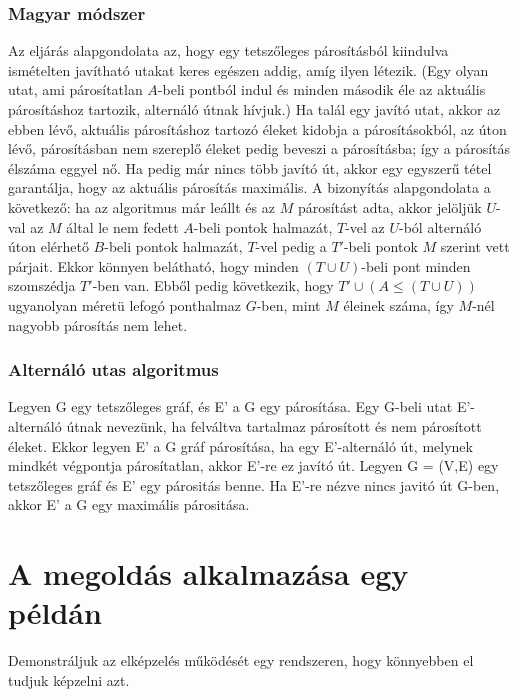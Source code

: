 \documentclass[12pt]{article}
\begin{document}
\subsubsection{Magyar módszer}

Az eljárás alapgondolata az, hogy egy tetszőleges párosításból kiindulva ismételten javítható utakat keres egészen addig, amíg ilyen létezik. (Egy olyan utat, ami párosítatlan $A$-beli pontból indul és minden második éle az aktuális párosításhoz tartozik, alternáló útnak hívjuk.) Ha talál egy javító utat, akkor az ebben lévő, aktuális párosításhoz tartozó éleket kidobja a párosításokból, az úton lévő, párosításban nem szereplő éleket pedig beveszi a párosításba; így a párosítás élszáma eggyel nő. Ha pedig már nincs több javító út, akkor egy egyszerű tétel garantálja, hogy az aktuális párosítás maximális. A bizonyítás alapgondolata a következő: ha az algoritmus már leállt és az $M$ párosítást adta, akkor jelöljük $U$-val az $M$ által le nem fedett $A$-beli pontok halmazát, $T$-vel az $U$-ból alternáló úton elérhető $B$-beli pontok halmazát, $T$-vel pedig a $T'$-beli pontok $M$ szerint vett párjait. Ekkor könnyen belátható, hogy minden $(T \cup U)$-beli pont minden szomszédja $T'$-ben van. Ebből pedig következik, hogy $T' \cup (A \leq (T \cup U))$ ugyanolyan méretü lefogó ponthalmaz $G$-ben, mint $M$ éleinek száma, így $M$-nél nagyobb párosítás nem lehet. ~\cite{frank2002magyar}\\ 


\subsubsection{Alternáló utas algoritmus}

Legyen G egy tetszőleges gráf, és E' a G egy párosítása. Egy G-beli utat E'-alternáló útnak nevezünk, ha felváltva tartalmaz párosított és nem párosított éleket. Ekkor legyen E' a G gráf párosítása, ha egy E'-alternáló út, melynek mindkét végpontja párosítatlan, akkor E'-re ez javító út.
Legyen G = (V,E) egy tetszőleges gráf és E' egy párositás benne. Ha E'-re nézve nincs javitó út G-ben, akkor E' a G egy maximális párositása. ~\cite{algelm:kat}\\

\pagebreak

\section{A megoldás alkalmazása egy példán}


Demonstráljuk az elképzelés működését egy rendszeren, hogy könnyebben el tudjuk képzelni azt.\\
\end{document}
